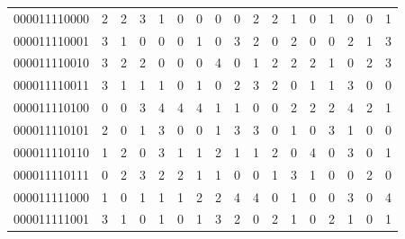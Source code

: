 \documentclass[10pt,a4paper]{article}
\begin{document}
\begin{longtable}{ |c|c|c|c|c|c|c|c|c|c|c|c|c|c|c|c|c| }
    000011110000              & 2                            & 2                                & 3                            & 1                              & 0   & 0   & 0   & 0   & 2   & 2   & 1   & 0   & 1   & 0   & 0   & 1   \\
    000011110001              & 3                            & 1                                & 0                            & 0                              & 0   & 1   & 0   & 3   & 2   & 0   & 2   & 0   & 0   & 2   & 1   & 3   \\
    000011110010              & 3                            & 2                                & 2                            & 0                              & 0   & 0   & 4   & 0   & 1   & 2   & 2   & 2   & 1   & 0   & 2   & 3   \\
    000011110011              & 3                            & 1                                & 1                            & 1                              & 0   & 1   & 0   & 2   & 3   & 2   & 0   & 1   & 1   & 3   & 0   & 0   \\
    000011110100              & 0                            & 0                                & 3                            & 4                              & 4   & 4   & 1   & 1   & 0   & 0   & 2   & 2   & 2   & 4   & 2   & 1   \\
    000011110101              & 2                            & 0                                & 1                            & 3                              & 0   & 0   & 1   & 3   & 3   & 0   & 1   & 0   & 3   & 1   & 0   & 0   \\
    000011110110              & 1                            & 2                                & 0                            & 3                              & 1   & 1   & 2   & 1   & 1   & 2   & 0   & 4   & 0   & 3   & 0   & 1   \\
    000011110111              & 0                            & 2                                & 3                            & 2                              & 2   & 1   & 1   & 0   & 0   & 1   & 3   & 1   & 0   & 0   & 2   & 0   \\
    000011111000              & 1                            & 0                                & 1                            & 1                              & 1   & 2   & 2   & 4   & 4   & 0   & 1   & 0   & 0   & 3   & 0   & 4   \\
    000011111001              & 3                            & 1                                & 0                            & 1                              & 0   & 1   & 3   & 2   & 0   & 2   & 1   & 0   & 2   & 1   & 0   & 1   \\

\end{longtable}
\end{document}
